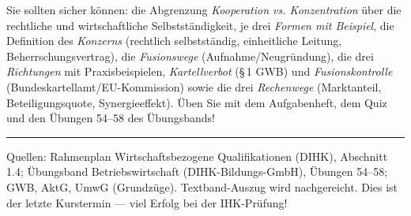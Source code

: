 \documentclass[11pt, a4paper]{article}
\begin{document}
\begin{merksatz}[title={\bfseries Wichtig für die Prüfungsvorbereitung}]
Sie sollten sicher können: die Abgrenzung \emph{Kooperation vs. Konzentration} über die
rechtliche und wirtschaftliche Selbstständigkeit, je drei \emph{Formen mit Beispiel},
die Definition des \emph{Konzerns} (rechtlich selbstständig, einheitliche Leitung,
Beherrschungsvertrag), die \emph{Fusionswege} (Aufnahme/Neugründung), die drei
\emph{Richtungen} mit Praxisbeispielen, \emph{Kartellverbot} (\S\,1 GWB) und
\emph{Fusionskontrolle} (Bundeskartellamt/EU-Kommission) sowie die drei
\emph{Rechenwege} (Marktanteil, Beteiligungsquote, Synergieeffekt). Üben Sie mit dem
Aufgabenheft, dem Quiz und den Übungen 54--58 des Übungsbands!
\end{merksatz}

\vspace{1em}
\hrule
\vspace{0.8em}
\noindent\textsf{\small Quellen: Rahmenplan Wirtschaftsbezogene Qualifikationen (DIHK), Abschnitt 1.4;
Übungsband Betriebswirtschaft (DIHK-Bildungs-GmbH), Übungen 54--58; GWB, AktG, UmwG (Grundzüge).
Textband-Auszug wird nachgereicht. Dies ist der letzte Kurstermin --- viel Erfolg bei der IHK-Prüfung!}
\end{document}
